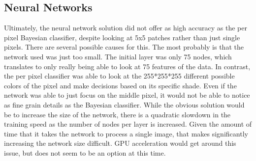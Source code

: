 \documentclass[12pt]{article}
\begin{document}
	\subsection{Neural Networks}
	Ultimately, the neural network solution did not offer as high accuracy as the per pixel Bayesian classifier, despite looking at 5x5 patches rather than just single pixels.  There are several possible causes for this.  The most probably is that the network used was just too small.  The initial layer was only 75 nodes, which translates to only really being able to look at 75 features of the data.  In contrast, the per pixel classifier was able to look at the 255*255*255 different possible colors of the pixel and make decisions based on its specific shade.  Even if the network was able to just focus on the middle pixel, it would not be able to notice as fine grain details as the Bayesian classifier.  While the obvious solution would be to increase the size of the network, there is a quadratic slowdown in the training speed as the number of nodes per layer is increased.  Given the amount of time that it takes the network to process a single image, that makes significantly increasing the network size difficult.  GPU acceleration would get around this issue, but does not seem to be an option at this time.
\end{document}
